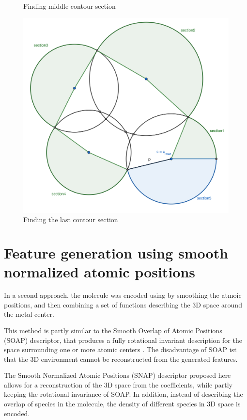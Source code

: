 \begin{figure}[!htb]
    \caption{Finding middle contour section}\label{fig:contour2}
  \endminipage\hfill
    \includegraphics[width=1.0\textwidth]{figures/contour/c3copy.pdf}
    \caption{Finding the last contour section}\label{fig:contour3}
  \endminipage
\end{figure}


\chapter{Feature generation using smooth normalized atomic positions}

In a second approach, the molecule was encoded using by smoothing the atmoic positions, 
and then combining a set of functions describing the 3D space around the metal center.

This method is partly similar to the Smooth Overlap of Atomic Positions (SOAP) descriptor, that produces a 
fully rotational invariant description for the space surrounding one or more atomic centers \cite{Bart_k_2013}.
The disadvantage of SOAP ist that the 3D environment cannot be reconstructed from the generated features.

The Smooth Normalized Atomic Positions (SNAP) descriptor proposed here allows for a reconstruction of the 3D space from the coefficients, 
while partly keeping the rotational invariance of SOAP. 
In addition, instead of describing the overlap of species in the molecule, the
density of different species in 3D space is encoded.

